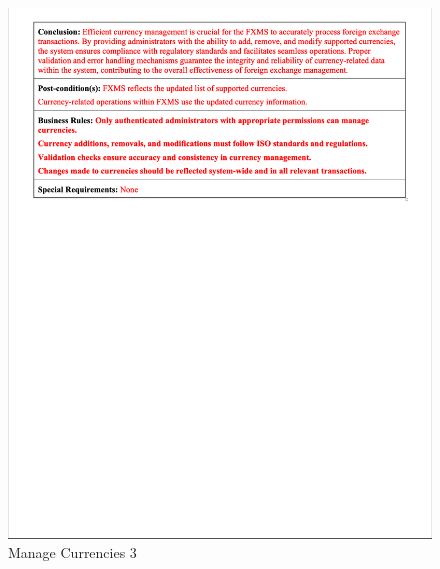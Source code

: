 \documentclass[a4paper]{report}
\begin{document}
\begin{figure}[h!]
    \centering
    \includegraphics[width=\textwidth]{images/uc/8.3-manage-currencies.png}
    \caption{Manage Currencies 3}
    \label{fig:8.3-manage-currencies}
\end{figure}
\end{document}
